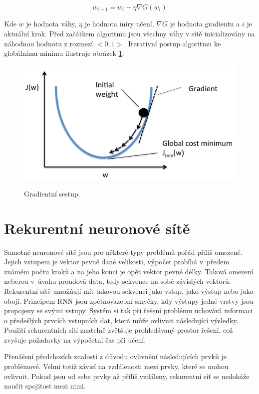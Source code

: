 \begin{equation}
    w_{i+1} = w_i - \eta \nabla G(w_i)
\end{equation}

Kde $w$ je hodnota váhy, $\eta$ je hodnota míry učení, 
$\nabla G$ je hodnota gradientu a $i$ je aktuální krok.
Před začátkem algoritmu jsou všechny váhy v sítě
inicializovány na náhodnou hodnotu z rozmezí $<0,1>$.
Iterativní postup algoritmu ke globálnímu minimu 
ilustruje obrázek \ref{obrazekGradientDescent}.
\cite{Raschka_GradientDescent, Goodfellow-et-al-2016}

\begin{figure}[h]\centering
    \centering
    \includegraphics[width=0.7\linewidth]{obrazky/GradientDescent.png}\\[1pt]  
    \caption{Gradientní sestup. \cite{Raschka_GradientDescent}}    
    \label{obrazekGradientDescent}
\end{figure}

\section{Rekurentní neuronové sítě}
Samotné neuronové sítě jsou pro některé typy problémů pořád příliš omezené.
Jejich vstupem je vektor pevně dané velikosti, 
výpočet probíhá v~předem známém počtu kroků 
a na jeho konci je opět vektor pevné délky.
Taková omezení neberou v~úvahu proudová data, 
tedy sekvence na sobě závislých vektorů.
Rekurentní sítě umožňují mít takovou sekvenci jako vstup, 
jako výstup nebo jako obojí.
Principem RNN jsou zpětnovazební smyčky, kdy výstupy jedné vrstvy jsou
propojeny se svými vstupy.
Systém si tak při řešení problému uchovává informaci
o předešlých prvcích vstupních dat,
která může ovlivnit následující výsledky.
Použití rekurentních sítí znatelně zvětšuje prohledávaný prostor řešení,
což zvyšuje požadavky na výpočetní čas při učení.
\par
Přenášení předchozích znalostí z důvodu ovlivnění 
následujících prvků je problémové.
Velmi totiž závisí na vzdálenosti mezi prvky,
které se mohou ovlivnit.
Pokud jsou od sebe prvky až příliš vzdáleny,
rekurentní síť se nedokáže naučit spojitost mezi nimi.
\cite{Karpathy_RNNs, colah_lstm}

